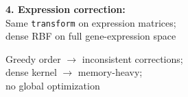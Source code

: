 \documentclass[8pt]{article}
\newlength{\colw}
\begin{document}
\begin{minipage}[t]{\colw}
\begin{stepbox}
\textbf{4. Expression correction:}\\
Same \texttt{transform} on expression matrices;\\
dense RBF on full gene-expression space
\end{stepbox}

\vspace{4pt}
\begin{center}
{\scriptsize\color{black!50} Greedy order $\to$ inconsistent corrections;\\
dense kernel $\to$ memory-heavy;\\
no global optimization}
\end{center}
\end{minipage}%
\hfill
\end{document}

